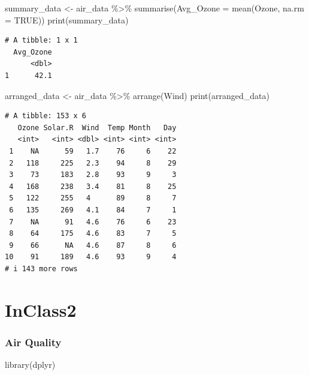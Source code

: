 \documentclass[
  letterpaper,
  DIV=11,
  numbers=noendperiod]{scrreprt}
\newenvironment{Shaded}{\begin{snugshade}}{\end{snugshade}}
\newcommand{\AttributeTok}[1]{\textcolor[rgb]{0.40,0.45,0.13}{#1}}
\newcommand{\ConstantTok}[1]{\textcolor[rgb]{0.56,0.35,0.01}{#1}}
\newcommand{\FunctionTok}[1]{\textcolor[rgb]{0.28,0.35,0.67}{#1}}
\newcommand{\NormalTok}[1]{\textcolor[rgb]{0.00,0.23,0.31}{#1}}
\newcommand{\OtherTok}[1]{\textcolor[rgb]{0.00,0.23,0.31}{#1}}
\newcommand{\SpecialCharTok}[1]{\textcolor[rgb]{0.37,0.37,0.37}{#1}}
\begin{document}
\begin{Shaded}
\begin{Highlighting}[]
\NormalTok{summary\_data }\OtherTok{\textless{}{-}}\NormalTok{ air\_data }\SpecialCharTok{\%\textgreater{}\%}
  \FunctionTok{summarise}\NormalTok{(}\AttributeTok{Avg\_Ozone =} \FunctionTok{mean}\NormalTok{(Ozone, }\AttributeTok{na.rm =} \ConstantTok{TRUE}\NormalTok{))}
\FunctionTok{print}\NormalTok{(summary\_data)}
\end{Highlighting}
\end{Shaded}

\begin{verbatim}
# A tibble: 1 x 1
  Avg_Ozone
      <dbl>
1      42.1
\end{verbatim}

\begin{Shaded}
\begin{Highlighting}[]
\NormalTok{arranged\_data }\OtherTok{\textless{}{-}}\NormalTok{ air\_data }\SpecialCharTok{\%\textgreater{}\%}
  \FunctionTok{arrange}\NormalTok{(Wind)}
\FunctionTok{print}\NormalTok{(arranged\_data)}
\end{Highlighting}
\end{Shaded}

\begin{verbatim}
# A tibble: 153 x 6
   Ozone Solar.R  Wind  Temp Month   Day
   <int>   <int> <dbl> <int> <int> <int>
 1    NA      59   1.7    76     6    22
 2   118     225   2.3    94     8    29
 3    73     183   2.8    93     9     3
 4   168     238   3.4    81     8    25
 5   122     255   4      89     8     7
 6   135     269   4.1    84     7     1
 7    NA      91   4.6    76     6    23
 8    64     175   4.6    83     7     5
 9    66      NA   4.6    87     8     6
10    91     189   4.6    93     9     4
# i 143 more rows
\end{verbatim}


\hypertarget{inclass2}{%
\chapter{InClass2}\label{inclass2}}

\hypertarget{air-quality-1}{%
\subsection{Air Quality}\label{air-quality-1}}

\begin{Shaded}
\begin{Highlighting}[]
\FunctionTok{library}\NormalTok{(dplyr)}
\end{Highlighting}
\end{Shaded}
\end{document}

